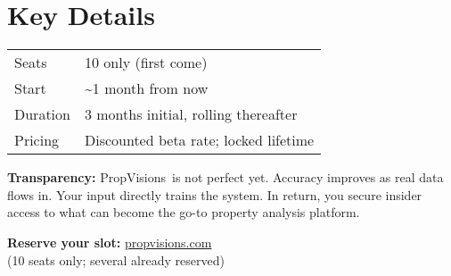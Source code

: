 \documentclass[11pt,a4paper]{article}
\newcommand{\product}{PropVisions}
\begin{document}
\section*{Key Details}
\begin{tabular}{@{}ll}
\toprule
Seats & 10 only (first come) \\
Start & \textasciitilde 1 month from now \\
Duration & 3 months initial, rolling thereafter \\
Pricing & Discounted beta rate; locked lifetime \\
\bottomrule
\end{tabular}

\vspace{1em}
\noindent \textbf{Transparency:} \product\ is not perfect yet. Accuracy improves as real data flows in. Your input directly trains the system. In return, you secure insider access to what can become the go-to property analysis platform.

\vfill
\begin{center}
  \textbf{Reserve your slot:} \href{https://www.propvisions.com/}{propvisions.com} \\
  (10 seats only; several already reserved)
\end{center}
\end{document}
